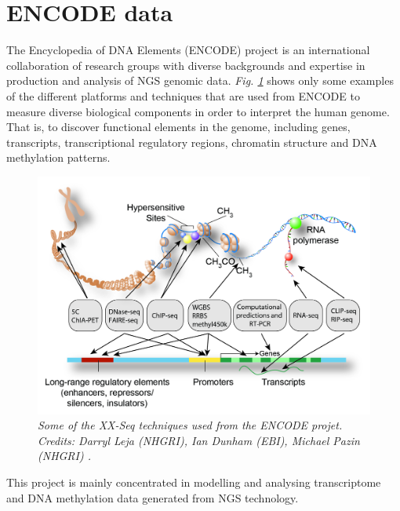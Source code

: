 \section{ENCODE data} \label{encode-data-sect}
The Encyclopedia of DNA Elements (ENCODE) project \citep{Dunham2012} is an international collaboration of research groups with diverse backgrounds and expertise in production and analysis of NGS genomic data. \emph{Fig. \ref{encode-seq-pic}} shows only some examples of the different platforms and techniques that are used from ENCODE to measure diverse biological components in order to interpret the human genome. That is, to discover functional elements in the genome, including genes, transcripts, transcriptional regulatory regions, chromatin structure and DNA methylation patterns.

\begin{figure}[!ht]
\begin{center}
 \includegraphics[scale = 0.25]{images/encode-seq.png}
\caption{\emph{Some of the XX-Seq techniques used from the ENCODE projet. Credits: Darryl Leja (NHGRI), Ian Dunham (EBI), Michael Pazin (NHGRI) \citep{Dunham2012}.}}
\label{encode-seq-pic}
\end{center}
\end{figure} 

This project is mainly concentrated in modelling and analysing transcriptome and DNA methylation data generated from NGS technology.